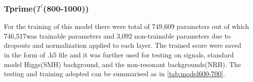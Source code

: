 \subsubsection{Tprime($T^'$(800-1000))}

For the training of this model there were total of 749,609 parameters out of which 746,517was trainable parameters and 3,092 non-trainable parameters due to dropouts and normalization applied to each layer. The trained score were saved in the form of .h5 file and it was further used for testing on signals, standard model Higgs(SMH) background, and the non-resonant backgrounds(NRB). The testing and training adopted can be summarised as in \autoref{tab:model600-700}.





    

